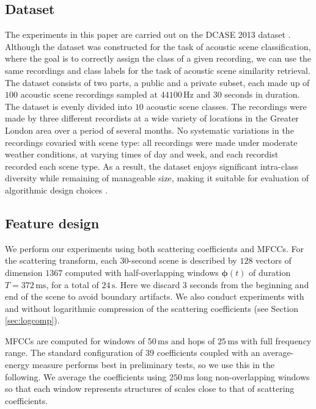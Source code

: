 \documentclass[smallextended]{svjour3}
\begin{document}
\subsection{Dataset}

The experiments in this paper are carried out on the DCASE 2013 dataset \cite{7100934}.
Although the dataset was constructed for the task of acoustic scene classification, where the goal is to correctly assign the class of a given recording, we can use the same recordings and class labels for the task of acoustic scene similarity retrieval.
The dataset consists of two parts, a public and a private subset, each made up of $100$ acoustic scene recordings sampled at $44100\,\mathrm{Hz}$ and $30$ seconds in duration. The dataset is evenly divided into $10$ acoustic scene classes. The recordings were made by three different recordists at a wide variety of locations in the Greater London area over a period of several months. No
systematic variations in the recordings covaried with scene
type: all recordings were made under moderate weather conditions, at varying times of day and week, and each recordist recorded each scene type. As a result, the dataset enjoys significant intra-class diversity while remaining of manageable size, making it suitable for evaluation of algorithmic design choices \cite{lagrange:hal-01082501}.

\subsection{Feature design}

We perform our experiments using both scattering coefficients and MFCCs. For the scattering transform, each $30$-second scene is described by $128$ vectors of dimension $1367$ computed with half-overlapping windows $\boldsymbol{\phi}(t)$ of duration $T=372\,\mathrm{ms}$, for a total of $24\,\mathrm{s}$. Here we discard $3$ seconds from the beginning and end of the scene to avoid boundary artifacts. We also conduct experiments with and without logarithmic compression of the scattering coefficients (see Section \ref{sec:logcomp}).

MFCCs are computed for windows of $50\,\mathrm{ms}$ and hops of $25\,\mathrm{ms}$ with full frequency range. The standard configuration of $39$ coefficients coupled with an average-energy measure performs best in preliminary tests, so we use this in the following. We average the coefficients using $250\,\mathrm{ms}$ long non-overlapping windows so that each window represents structures of scales close to that of scattering coefficients.
\end{document}
